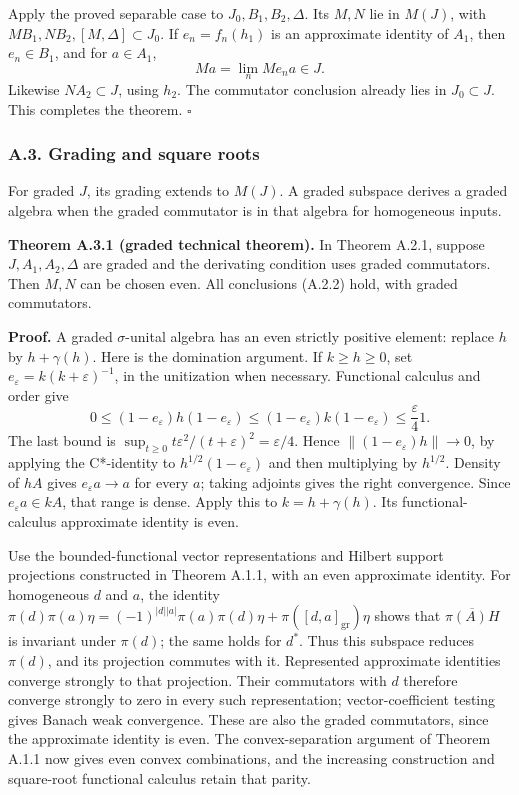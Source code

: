 \documentclass[
  11pt,
]{article}
\begin{document}
Apply the proved separable case to \(J_0,B_1,B_2,\Delta\). Its \(M,N\)
lie in \(M(J)\), with \(MB_1,NB_2,[M,\Delta]\subset J_0\). If
\(e_n=f_n(h_1)\) is an approximate identity of \(A_1\), then
\(e_n\in B_1\), and for \(a\in A_1\), \[
Ma=\lim_n Me_na\in J.
\tag{A.2.13}
\] Likewise \(NA_2\subset J\), using \(h_2\). The commutator conclusion
already lies in \(J_0\subset J\). This completes the theorem.
\(\square\)

\subsubsection{A.3. Grading and square
roots}\label{a.3.-grading-and-square-roots}

For graded \(J\), its grading extends to \(M(J)\). A graded subspace
derives a graded algebra when the graded commutator is in that algebra
for homogeneous inputs.

\textbf{Theorem A.3.1 (graded technical theorem).} In Theorem A.2.1,
suppose \(J,A_1,A_2,\Delta\) are graded and the derivating condition
uses graded commutators. Then \(M,N\) can be chosen even. All
conclusions (A.2.2) hold, with graded commutators.

\textbf{Proof.} A graded \(\sigma\)-unital algebra has an even strictly
positive element: replace \(h\) by \(h+\gamma(h)\). Here is the
domination argument. If \(k\ge h\ge0\), set
\(e_\varepsilon=k(k+\varepsilon)^{-1}\), in the unitization when
necessary. Functional calculus and order give \[
0\le(1-e_\varepsilon)h(1-e_\varepsilon)
\le(1-e_\varepsilon)k(1-e_\varepsilon)
\le\frac{\varepsilon}{4}1.
\] The last bound is
\(\sup_{t\ge0}t\varepsilon^2/(t+\varepsilon)^2=\varepsilon/4\). Hence
\(\|(1-e_\varepsilon)h\|\to0\), by applying the C*-identity to
\(h^{1/2}(1-e_\varepsilon)\) and then multiplying by \(h^{1/2}\).
Density of \(hA\) gives \(e_\varepsilon a\to a\) for every \(a\); taking
adjoints gives the right convergence. Since \(e_\varepsilon a\in kA\),
that range is dense. Apply this to \(k=h+\gamma(h)\). Its
functional-calculus approximate identity is even.

Use the bounded-functional vector representations and Hilbert support
projections constructed in Theorem A.1.1, with an even approximate
identity. For homogeneous \(d\) and \(a\), the identity
\(\pi(d)\pi(a)\eta=(-1)^{|d||a|}\pi(a)\pi(d)\eta+\pi([d,a]_{\mathrm{gr}})\eta\)
shows that \(\overline{\pi(A)H}\) is invariant under \(\pi(d)\); the
same holds for \(d^*\). Thus this subspace reduces \(\pi(d)\), and its
projection commutes with it. Represented approximate identities converge
strongly to that projection. Their commutators with \(d\) therefore
converge strongly to zero in every such representation;
vector-coefficient testing gives Banach weak convergence. These are also
the graded commutators, since the approximate identity is even. The
convex-separation argument of Theorem A.1.1 now gives even convex
combinations, and the increasing construction and square-root functional
calculus retain that parity.
\end{document}
